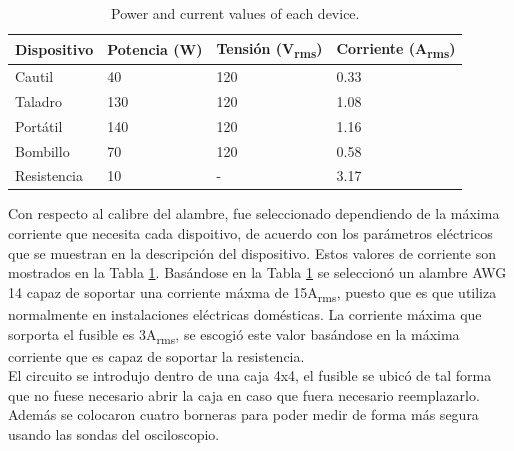 \documentclass[journal]{IEEEtran}
\begin{document}

\begin{table}[h]
\centering
\begin{tabular}{|l|p{1.2cm}|p{1.5cm}|p{1.5cm}|}
\hline 
Dispositivo & Potencia (W) & Tensión (V\textsubscript{rms}) 
& Corriente (A\textsubscript{rms}) \\ \hline 
Cautil 	&  40	& 120 	& 0.33 \\ \hline 
Taladro 		& 130	& 120   & 1.08 \\ \hline 
Portátil 		& 140 	& 120   & 1.16 \\ \hline 
Bombillo		& 70  	& 120   & 0.58 \\ \hline 
Resistencia & 10 & - & 3.17 \\ \hline
\end{tabular}
\caption{Power and current values of each device.}
\label{current_table}
\end{table}

Con respecto al calibre del alambre, fue seleccionado 
dependiendo de la máxima corriente que necesita cada 
dispoitivo, de acuerdo con los parámetros eléctricos 
que se muestran en la descripción del dispositivo. Estos
valores de corriente son mostrados en la Tabla
\ref{current_table}. Basándose en la 
Tabla \ref{current_table} se seleccionó un alambre 
AWG 14 capaz de soportar una corriente máxma de 
15A\textsubscript{rms}, puesto que es que utiliza 
normalmente en instalaciones eléctricas domésticas. 
La corriente máxima que sorporta el fusible es 
3A\textsubscript{rms}, se escogió este valor basándose
en la máxima corriente que es capaz de soportar la 
resistencia. \\

El circuito se introdujo dentro de una caja 4x4, el 
fusible se ubicó de tal forma que no fuese necesario 
abrir la caja en caso que fuera necesario reemplazarlo. 
Además se colocaron 
cuatro borneras para poder medir de forma más segura 
usando las sondas del osciloscopio. \\

\end{document}

